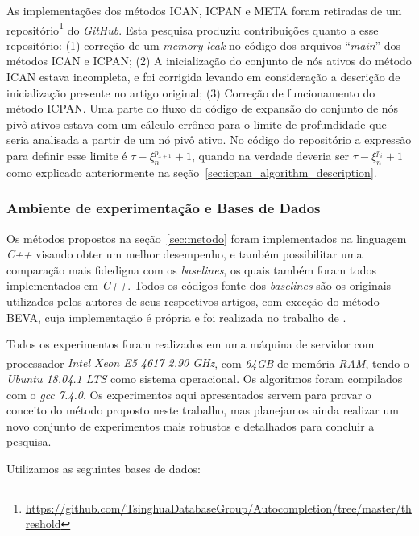 As implementações dos métodos ICAN, ICPAN e META foram retiradas de um repositório\footnote{\url{https://github.com/TsinghuaDatabaseGroup/Autocompletion/tree/master/threshold}} do \textit{GitHub}. Esta pesquisa produziu contribuições quanto a esse repositório: (1) correção de um \textit{memory leak} no código dos arquivos ``\textit{main}'' dos métodos ICAN e ICPAN; (2) A inicialização do conjunto de nós ativos do método ICAN estava incompleta, e foi corrigida levando em consideração a descrição de inicialização presente no artigo original; (3) Correção de funcionamento do método ICPAN. Uma parte do fluxo do código de expansão do conjunto de nós pivô ativos estava com um cálculo errôneo para o limite de profundidade que seria analisada a partir de um nó pivô ativo. No código do repositório a expressão para definir esse limite é $\tau - \xi_{n}^{p_{x+1}} + 1$, quando na verdade deveria ser $\tau - \xi_{n}^{p_{i}} + 1$ como explicado anteriormente na seção~\ref{sec:icpan_algorithm_description}. 

\subsubsection{Ambiente de experimentação e Bases de Dados}

Os métodos propostos na seção~\ref{sec:metodo} foram implementados na linguagem \textit{C++} visando obter um melhor desempenho, e também possibilitar uma comparação mais fidedigna com os \textit{baselines}, os quais também foram todos implementados em \textit{C++}. Todos os códigos-fonte dos \textit{baselines} são os originais utilizados pelos autores de seus respectivos artigos, com exceção do método BEVA, cuja implementação é própria e foi realizada no trabalho de \cite{berg2020}.

Todos os experimentos foram realizados em uma máquina de servidor com processador \textit{Intel \textsuperscript{\textregistered} Xeon E5 4617 2.90 GHz}, com \textit{64GB} de memória \textit{RAM}, tendo o \textit{Ubuntu 18.04.1 LTS} como sistema operacional. Os algoritmos foram compilados com o \textit{gcc 7.4.0}. Os experimentos aqui apresentados servem para provar o conceito do método proposto neste trabalho, mas planejamos ainda realizar um novo conjunto de experimentos mais robustos e detalhados para concluir a pesquisa.

Utilizamos as seguintes bases de dados:

